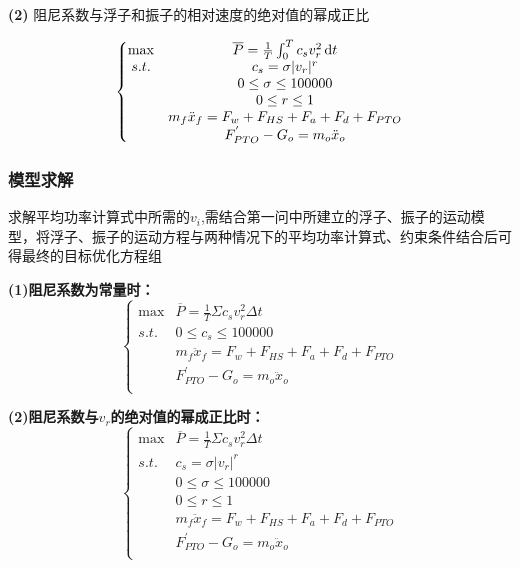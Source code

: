 \documentclass{my_paper}
\begin{document}
    \textbf{(2)} 阻尼系数与浮子和振子的相对速度的绝对值的幂成正比
        
        \begin{equation}
            \left\{\begin{matrix}
                \max & \overline{P}=\frac{1}{T}\int_{0}^{T}{c_{s} v_{r}^2}\,{\rm d}t\\
                s.t. & c_{s}=\sigma \lvert v_{r}\rvert^r\\
                    & 0\leq \sigma\leq 100000 \\
                    & 0\leq r\leq 1 \\ 
                    &  m_f \ddot x_f = F_w+F_{HS}+F_a+F_d+F_{PTO}\\
                    &  F_{PTO}^{'}-G_o=m_o\ddot x_o\\
            \end{matrix}
            \right.
        \end{equation}


\subsubsection{模型求解}

求解平均功率计算式中所需的$v_{i}$,需结合第一问中所建立的浮子、振子的运动模型，将浮子、振子的运动方程与两种情况下的平均功率计算式、约束条件结合后可得最终的目标优化方程组

\noindent\textbf{(1)阻尼系数为常量时：}
\begin{equation}
            \left\{\begin{matrix}
                \max & \overline{P}=\frac{1}{T}\Sigma{c_{s} v_{r}^2 \Delta t}\\
                s.t. & 0 \leq c_s\leq 100000 \\
                    &  m_f \ddot x_f = F_w+F_{HS}+F_a+F_d+F_{PTO}\\
                    &  F_{PTO}^{'}-G_o=m_o\ddot x_o\\
            \end{matrix}
            \right.
        \end{equation}

\noindent\textbf{(2)阻尼系数与$v_r$的绝对值的幂成正比时：}
\begin{equation}
    \left\{\begin{matrix}
       \max & \overline{P}=\frac{1}{T}\Sigma{c_{s} v_{r}^2 \Delta t}\\
        s.t. & c_{s}=\sigma \lvert v_{r}\rvert^r\\
            & 0\leq \sigma\leq 100000 \\
            & 0\leq r\leq 1 \\ 
            &  m_f \ddot x_f = F_w+F_{HS}+F_a+F_d+F_{PTO}\\
            &  F_{PTO}^{'}-G_o=m_o\ddot x_o\\
    \end{matrix}
    \right.
\end{equation}
\end{document}
